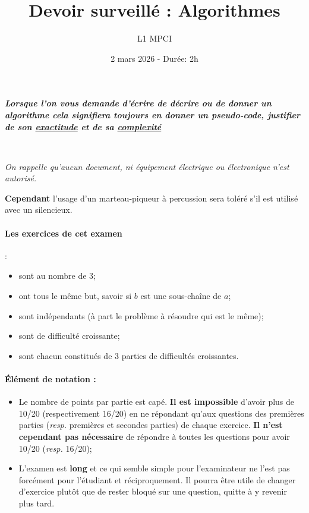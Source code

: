 \documentclass{article}
\title{Devoir surveillé : Algorithmes}
\author{L1 MPCI}
\date{2 mars 2026 - Durée: 2h}
\theoremstyle{exostyle}
\theoremstyle{partiestyle}
\theoremstyle{questionstyle}
\begin{document}
\maketitle

\begin{center}
{\em\bf Lorsque l'on vous demande d'écrire de décrire ou de donner un algorithme cela signifiera toujours en donner un pseudo-code, justifier de son \underline{exactitude} et de sa \underline{complexité}}

~\\

{\em On rappelle qu'aucun document, ni équipement électrique ou électronique n'est autorisé.

 {\bf Cependant} l'usage d'un marteau-piqueur à percussion sera toléré s'il est utilisé avec un silencieux.}
\end{center}


\vspace*{1cm}

\paragraph{Les exercices de cet examen} :
\begin{itemize}
\item sont au nombre de 3;
\item ont tous le même but, savoir si $b$ est une sous-chaîne de $a$;
\item sont indépendants (à part le problème à résoudre qui est le même);
\item sont de difficulté croissante;
\item sont chacun constitués de 3 parties de difficultés croissantes.
\end{itemize}

\paragraph{Élément de notation :}
\begin{itemize}
\item  Le nombre de points par partie est capé. {\bf Il est impossible} d'avoir plus de 10/20 (respectivement 16/20) en ne répondant qu'aux questions des premières parties (\textit{resp.} premières et secondes parties) de chaque exercice. {\bf Il n'est cependant pas nécessaire} de répondre à toutes les questions pour avoir 10/20 (\textit{resp.} 16/20);
\item L'examen est {\bf long} et ce qui semble simple pour l'examinateur ne l'est pas forcément pour l'étudiant et réciproquement. Il pourra être utile de changer d'exercice plutôt que de rester bloqué sur une question, quitte à y revenir plus tard.
\end{itemize}
\end{document}
